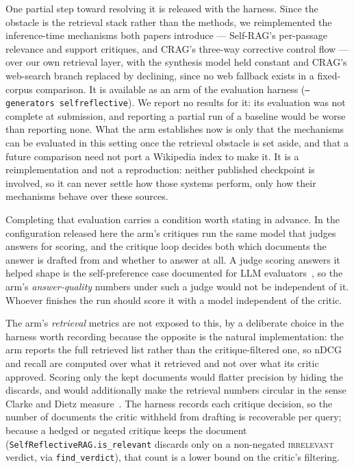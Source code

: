 \documentclass[acmsmall,anonymous,screen]{acmart}
\begin{document}
One partial step toward resolving it is released with the harness. Since the
obstacle is the retrieval stack rather than the methods, we reimplemented the
inference-time mechanisms both papers introduce --- Self-RAG's per-passage
relevance and support critiques, and CRAG's three-way corrective control flow
--- over our own retrieval layer, with the synthesis model held constant and
CRAG's web-search branch replaced by declining, since no web fallback exists in
a fixed-corpus comparison. It is available as an arm of the evaluation harness
(\texttt{--generators selfreflective}). We report no results for it: its
evaluation was not complete at submission, and reporting a partial run of a
baseline would be worse than reporting none. What the arm establishes now is
only that the mechanisms can be evaluated in this setting once the retrieval
obstacle is set aside, and that a future comparison need not port a Wikipedia
index to make it. It is a reimplementation and not a reproduction: neither
published checkpoint is involved, so it can never settle how those systems
perform, only how their mechanisms behave over these sources.

Completing that evaluation carries a condition worth stating in advance. In the
configuration released here the arm's critiques run the same model that judges
answers for scoring, and the critique loop decides both which documents the
answer is drafted from and whether to answer at all. A judge scoring answers it
helped shape is the self-preference case documented for LLM
evaluators~\cite{panickssery2024self,zheng2023judge}, so the arm's
\emph{answer-quality} numbers under such a judge would not be independent of it.
Whoever finishes the run should score it with a model independent of the critic.

The arm's \emph{retrieval} metrics are not exposed to this, by a deliberate
choice in the harness worth recording because the opposite is the natural
implementation: the arm reports the full retrieved list rather than the
critique-filtered one, so nDCG and recall are computed over what it retrieved
and not over what its critic approved. Scoring only the kept documents would
flatter precision by hiding the discards, and would additionally make the
retrieval numbers circular in the sense Clarke and Dietz
measure~\cite{clarke2024cannot}. The harness records each critique decision, so
the number of documents the critic withheld from drafting is recoverable per
query; because a hedged or negated critique keeps the document
(\texttt{SelfReflectiveRAG.is\_relevant} discards only on a non-negated
\textsc{irrelevant} verdict, via \texttt{find\_verdict}), that count is a lower
bound on the critic's filtering.
\end{document}
